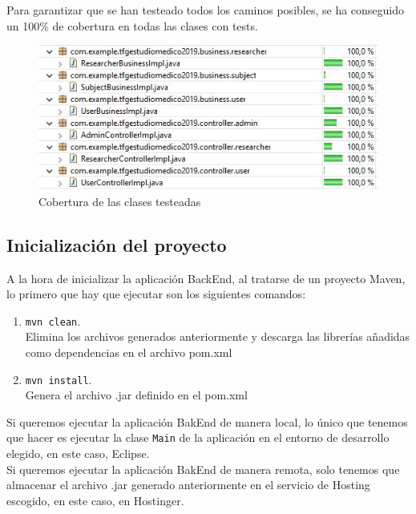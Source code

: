         Para garantizar que se han testeado todos los caminos posibles, se ha conseguido un 100\% de cobertura en todas las clases con tests.
        \newline
        
        
          \begin{figure}[h]
            \centering
            \includegraphics[width=1\textwidth]{images/coberturatests.JPG}
            \caption{Cobertura de las clases testeadas}
        \end{figure}
        

        
        
    \subsection{Inicialización del proyecto}
        A la hora de inicializar la aplicación BackEnd, al tratarse de un proyecto  Maven, lo primero que hay que ejecutar son los siguientes comandos: 
        
        \begin{enumerate}
          \item\texttt{mvn clean}.\\
          Elimina los archivos generados anteriormente y descarga las librerías añadidas como dependencias en el archivo pom.xml
          \item\texttt{mvn install}. \\
          Genera el archivo .jar definido en el pom.xml
        \end{enumerate}
        
        Si queremos ejecutar la aplicación BakEnd de manera local, lo único que tenemos que hacer es ejecutar la clase \texttt{Main} de la aplicación en el entorno de desarrollo elegido, en este caso, Eclipse. \\
        \newline
        Si queremos ejecutar la aplicación BakEnd de manera remota, solo tenemos que almacenar el archivo .jar generado anteriormente en el servicio de Hosting escogido, en este caso, en Hostinger\cite{hostinger}.
        
        
        
        
    